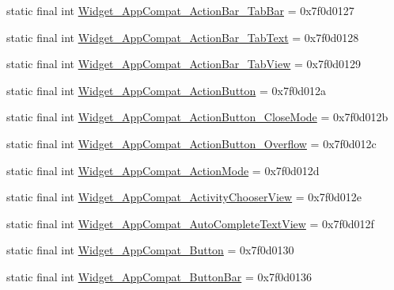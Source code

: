 \begin{DoxyCompactItemize}
\item 
static final int \mbox{\hyperlink{classandroid_1_1support_1_1design_1_1_r_1_1style_ae40e99b212bec9e1c06063f41df88461}{Widget\+\_\+\+App\+Compat\+\_\+\+Action\+Bar\+\_\+\+Tab\+Bar}} = 0x7f0d0127
\item 
static final int \mbox{\hyperlink{classandroid_1_1support_1_1design_1_1_r_1_1style_acd485e388828fa5a420f5e50cfcd5c88}{Widget\+\_\+\+App\+Compat\+\_\+\+Action\+Bar\+\_\+\+Tab\+Text}} = 0x7f0d0128
\item 
static final int \mbox{\hyperlink{classandroid_1_1support_1_1design_1_1_r_1_1style_a534241f1a7151bbcf5762714684ab67c}{Widget\+\_\+\+App\+Compat\+\_\+\+Action\+Bar\+\_\+\+Tab\+View}} = 0x7f0d0129
\item 
static final int \mbox{\hyperlink{classandroid_1_1support_1_1design_1_1_r_1_1style_adc94449ee45cee4172348d277d2e978c}{Widget\+\_\+\+App\+Compat\+\_\+\+Action\+Button}} = 0x7f0d012a
\item 
static final int \mbox{\hyperlink{classandroid_1_1support_1_1design_1_1_r_1_1style_ac4892bc2668902d80f74ad423544b36f}{Widget\+\_\+\+App\+Compat\+\_\+\+Action\+Button\+\_\+\+Close\+Mode}} = 0x7f0d012b
\item 
static final int \mbox{\hyperlink{classandroid_1_1support_1_1design_1_1_r_1_1style_a8eaafdb6030c487a3f7d67fd06e9323d}{Widget\+\_\+\+App\+Compat\+\_\+\+Action\+Button\+\_\+\+Overflow}} = 0x7f0d012c
\item 
static final int \mbox{\hyperlink{classandroid_1_1support_1_1design_1_1_r_1_1style_ae00ca1a5ddcb0b444fe407053fda8398}{Widget\+\_\+\+App\+Compat\+\_\+\+Action\+Mode}} = 0x7f0d012d
\item 
static final int \mbox{\hyperlink{classandroid_1_1support_1_1design_1_1_r_1_1style_a5a00945d297c6b206b77513c61aa7584}{Widget\+\_\+\+App\+Compat\+\_\+\+Activity\+Chooser\+View}} = 0x7f0d012e
\item 
static final int \mbox{\hyperlink{classandroid_1_1support_1_1design_1_1_r_1_1style_a59a59eff9a03b45874ac8f473383f081}{Widget\+\_\+\+App\+Compat\+\_\+\+Auto\+Complete\+Text\+View}} = 0x7f0d012f
\item 
static final int \mbox{\hyperlink{classandroid_1_1support_1_1design_1_1_r_1_1style_ab5be18ddf0db368da54bf41e883e3f82}{Widget\+\_\+\+App\+Compat\+\_\+\+Button}} = 0x7f0d0130
\item 
static final int \mbox{\hyperlink{classandroid_1_1support_1_1design_1_1_r_1_1style_ad4189a3152639a49105b220b6a35cb39}{Widget\+\_\+\+App\+Compat\+\_\+\+Button\+Bar}} = 0x7f0d0136
\item 

\end{DoxyCompactItemize}
